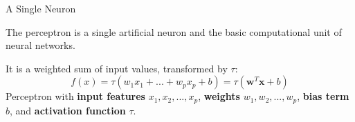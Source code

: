 \documentclass[11pt,compress,t,notes=noshow, xcolor=table]{beamer}
\begin{document}




\begin{framei} {A Single Neuron}
\vfill
\item The perceptron is a single artificial neuron and the basic computational unit of neural networks.
\vfill
\item It is a weighted sum of input values, transformed by $\tau$:
\vfill
$$f(x) = \tau(w_1x_1 + ... + w_px_p +  b) = \tau(\mathbf{w}^T \mathbf{x}+b)$$
\vfill
{}
{\footnotesize Perceptron %
with \textbf{input features} $x_1, x_2, ... ,x_p$, \textbf{weights} $w_1, w_2,... ,w_p$, \textbf{bias term} $b$, and \textbf{activation function} $\tau$.}
\end{framei}
\end{document}
